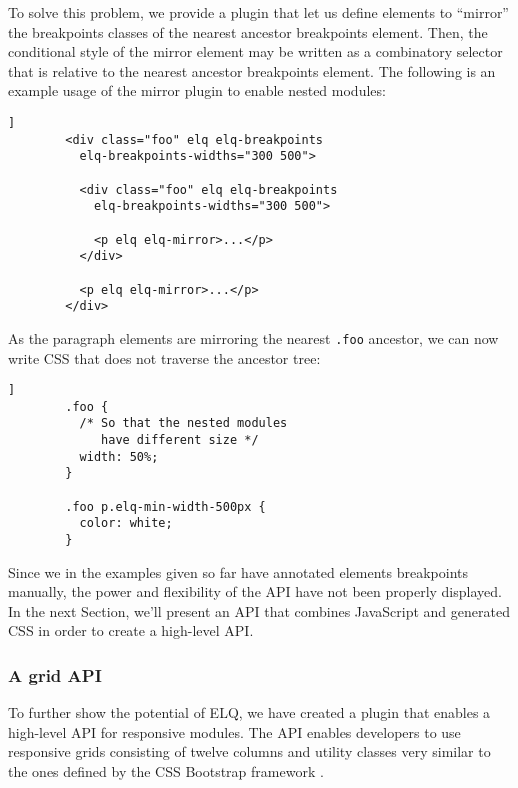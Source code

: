 \documentclass{acm_proc_article-sp}
\newcommand{\code}[1]{\texttt{#1}}
\newcommand{\elq}{ELQ}
\begin{document}
      To solve this problem, we provide a plugin that let us define elements to ``mirror'' the breakpoints classes of the nearest ancestor breakpoints element.
      Then, the conditional style of the mirror element may be written as a combinatory selector that is relative to the nearest ancestor breakpoints element.
      The following is an example usage of the mirror plugin to enable nested modules:

      \begin{lstlisting}[gobble=8,caption={},captionpos=b,label={}]]
        <div class="foo" elq elq-breakpoints
          elq-breakpoints-widths="300 500">
          
          <div class="foo" elq elq-breakpoints
            elq-breakpoints-widths="300 500">

            <p elq elq-mirror>...</p>
          </div>

          <p elq elq-mirror>...</p>
        </div>
      \end{lstlisting}

      As the paragraph elements are mirroring the nearest \code{.foo} ancestor, we can now write CSS that does not traverse the ancestor tree:

      \begin{lstlisting}[gobble=8,caption={},captionpos=b,label={code:elq-mirror-example-css}]]
        .foo {
          /* So that the nested modules
             have different size */
          width: 50%;
        }

        .foo p.elq-min-width-500px {
          color: white;
        }
      \end{lstlisting}

      Since we in the examples given so far have annotated elements breakpoints manually, the power and flexibility of the API have not been properly displayed.
      In the next Section, we'll present an API that combines JavaScript and generated CSS in order to create a high-level API.

    \subsubsection{A grid API}
      To further show the potential of \elq{}, we have created a plugin that enables a high-level API for responsive modules.
      The API enables developers to use responsive grids consisting of twelve columns and utility classes very similar to the ones defined by the CSS Bootstrap framework \cite{bootstrap}.
      
\end{document}
